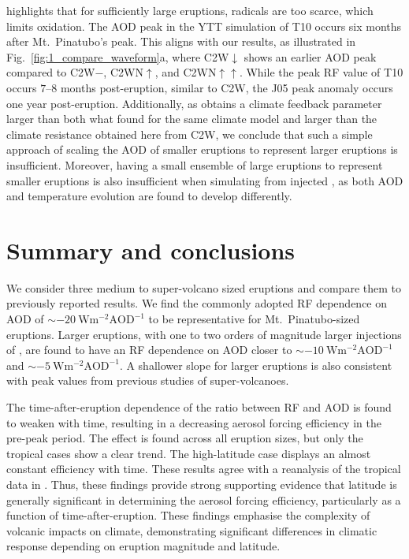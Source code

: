 \documentclass[draft]{agujournal2019}
\newcommand{\iso}[1][i]{{#1}njected \ce{SO2}}
\newcommand{\cw}{C2W}
\newcommand{\cwm}{C2W\(\downarrow\)}
\newcommand{\cwmp}{C2W\(-\)}
\newcommand{\cws}{C2WN\(\uparrow\)}
\newcommand{\cwss}{C2WN\(\uparrow\uparrow\)}
\begin{document}
 highlights that for sufficiently large eruptions,  radicals
are too scarce, which limits  oxidation. The AOD peak in the YTT simulation of
T10 occurs six months after Mt.\ Pinatubo's peak. This aligns with our results, as
illustrated in Fig.~\ref{fig:1_compare_waveform}a, where \cwm{} shows an earlier AOD
peak compared to \cwmp{}, \cws{}, and \cwss{}. While the peak RF value of T10 occurs
\(7\)--\(8\) months post-eruption, similar to \cw{}, the J05 peak anomaly occurs one
year post-eruption. Additionally, as  obtains a climate feedback
parameter larger than both what  found for the same climate model and
larger than the climate resistance obtained here from \cw{}, we conclude that such a
simple approach of scaling the AOD of smaller eruptions to represent larger eruptions is
insufficient. Moreover, having a small ensemble of large eruptions to represent smaller
eruptions is also insufficient when simulating from \iso{}, as both AOD and temperature
evolution are found to develop differently.

\section{Summary and conclusions}\label{sec:conclusions}

We consider three medium to super-volcano sized eruptions and compare them to previously
reported results. We find the commonly adopted RF dependence on AOD of
\(\sim\SI{-20}{\watt\metre^{-2}\mathrm{AOD}^{-1}}\) to be representative for Mt.\
Pinatubo-sized eruptions. Larger eruptions, with one to two orders of magnitude larger
injections of \ce{SO2}, are found to have an RF dependence on AOD closer to
\(\sim\SI{-10}{\watt\metre^{-2}\mathrm{AOD}^{-1}}\) and
\(\sim\SI{-5}{\watt\metre^{-2}\mathrm{AOD}^{-1}}\). A shallower slope for larger
eruptions is also consistent with peak values from previous studies of super-volcanoes.

The time-after-eruption dependence of the ratio between RF and AOD is found to weaken
with time, resulting in a decreasing aerosol forcing efficiency in the pre-peak period.
The effect is found across all eruption sizes, but only the tropical cases show a clear
trend. The high-latitude case displays an almost constant efficiency with time. These
results agree with a reanalysis of the tropical data in \citeA{marshall2020dataset}.
Thus, these findings provide strong supporting evidence that latitude is generally
significant in determining the aerosol forcing efficiency, particularly as a function of
time-after-eruption. These findings emphasise the complexity of volcanic impacts on
climate, demonstrating significant differences in climatic response depending on
eruption magnitude and latitude.
\end{document}

